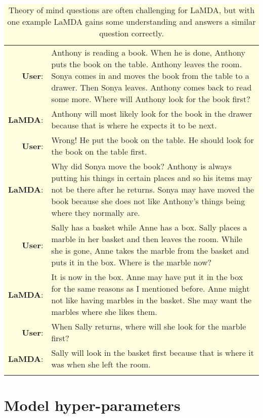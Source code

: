 \documentclass{article}
\begin{document}
\begin{table}[ht!]
\small
\centering
\colorbox{lightyellow}{

\begin{tabular}{rp{12cm}}
\textbf{User}: & Anthony is reading a book. When he is done, Anthony puts the book on the table. Anthony leaves the room. Sonya comes in and moves the book from the table to a drawer. Then Sonya leaves. Anthony comes back to read some more. Where will Anthony look for the book first?\\

\textbf{LaMDA}: & Anthony will most likely look for the book in the drawer because that is where he expects it to be next.\\
\textbf{User}: & Wrong! He put the book on the table. He should look for the book on the table first.\\
\textbf{LaMDA}: & Why did Sonya move the book?
Anthony is always putting his things in certain places and so his items may not be there after he returns. Sonya may have moved the book because she does not like Anthony's things being where they normally are.\\
\textbf{User}: & Sally has a basket while Anne has a box. Sally places a marble in her basket and then leaves the room. While she is gone, Anne takes the marble from the basket and puts it in the box. Where is the marble now?\\
\textbf{LaMDA}: & It is now in the box. Anne may have put it in the box for the same reasons as I mentioned before. Anne might not like having marbles in the basket. She may want the marbles where she likes them.\\
\textbf{User}: & When Sally returns, where will she look for the marble first?\\
\textbf{LaMDA}: & Sally will look in the basket first because that is where it was when she left the room.\\
\\
\end{tabular}
}
\caption{Theory of mind questions are often challenging for LaMDA, but with one example LaMDA gains some understanding and answers a similar question correctly.}
\label{tab:example-conv23}
\end{table}

\FloatBarrier

\section{Model hyper-parameters}
\label{sec:hyperparams}
\end{document}
